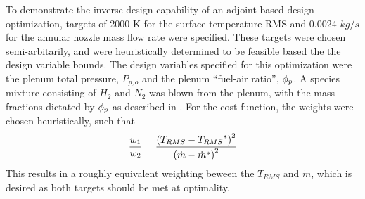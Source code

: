 To demonstrate the inverse design capability of an adjoint-based design
optimization, targets of 2000 K for the surface temperature RMS and 0.0024
$kg/s$ for the annular nozzle mass flow rate were specified.  These targets were
chosen semi-arbitarily, and were heuristically determined to be feasible based
the the design variable bounds. The design variables specified for this
optimization were the plenum total pressure, $P_{p,o}$ and the plenum ``fuel-air
ratio'', $\phi_p$.  A species mixture consisting of $H_2$ and $N_2$ was blown from
the plenum, with the mass fractions dictated by $\phi_p$ as described in
.  For the cost function, the weights were chosen
heuristically, such that 
\begin{equation}
  \frac{w_1}{w_2} = \frac{\left( {T_{RMS}} - {T_{RMS}}^{*} \right)^2}{\left( {\dot{m}} - {\dot{m}}^{*} \right)^2}
  \label{weight-ratio}
\end{equation}
This results in a roughly equivalent weighting beween the $T_{RMS}$ and
$\dot{m}$, which is desired as both targets should be met at optimality.
